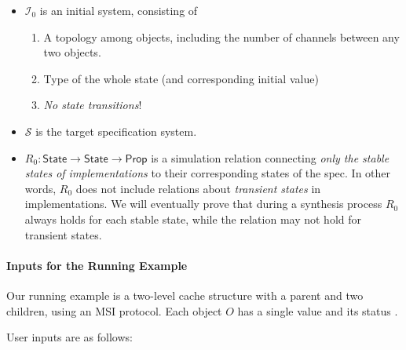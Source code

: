 \documentclass[format=manuscript]{acmart}
\begin{document}
\begin{itemize}
\item $\mathcal{I}_0$ is an initial system, consisting of
  \begin{enumerate}
  \item A topology among objects, including the number of channels between any
    two objects.
  \item Type of the whole state (and corresponding initial value)
  \item \emph{No state transitions}!
  \end{enumerate}
\item $\mathcal{S}$ is the target specification system.
\item $R_0: \textsf{State} \to \textsf{State} \to \textsf{Prop}$ is a simulation
  relation connecting \emph{only the stable states of implementations} to their
  corresponding states of the spec. In other words, $R_0$ does not include
  relations about \emph{transient states} in implementations. We will eventually
  prove that during a synthesis process $R_0$ always holds for each stable
  state, while the relation may not hold for transient states.
\end{itemize}

\paragraph{Inputs for the Running Example}
Our running example is a two-level cache structure with a parent and two
children, using an MSI protocol. Each object $O$ has a single value 
and its status .

User inputs are as follows:
\end{document}
